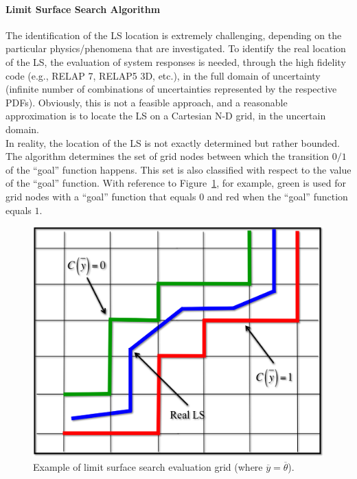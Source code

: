 \paragraph{Limit Surface Search Algorithm}
\label{par:LSSalgorithm}
The identification of the LS location is extremely challenging, 
depending on the particular physics/phenomena that are investigated. 
To identify the real location of the LS, the evaluation of system 
responses is needed, through the high fidelity code (e.g., RELAP 7, 
RELAP5 3D, etc.), in the full domain of uncertainty (infinite number of 
combinations of uncertainties represented by the respective PDFs). 
Obviously, this is not a feasible approach, and a reasonable 
approximation is to locate the LS on a Cartesian N-D grid, in the 
uncertain domain.
\\In reality, the location of the LS is not exactly determined but rather 
bounded. The algorithm determines the set of grid nodes between 
which the transition $0/1$ of the ``goal'' function happens. This set is 
also classified with respect to the value of the ``goal'' function. With 
reference to Figure~\ref{fig:LSgoalFunctionExample}, for example, 
green is used for grid nodes with a 
``goal'' function that equals $0$ and red when the ``goal'' function 
equals $1$.
\begin{figure}[h!]
  \centering
  \includegraphics[width=1.0\textwidth]  {pics/LSgoalFunctionExample.png}
  \caption{Example of limit surface search evaluation grid (where $\overline{y}=\overline{\theta}$).}
  \label{fig:LSgoalFunctionExample}
\end{figure}

